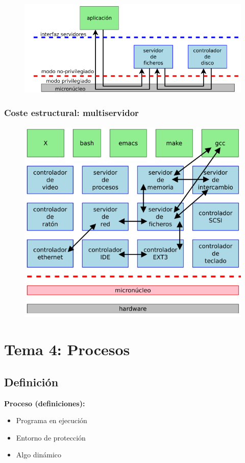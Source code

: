 \documentclass{article}
\begin{document}
\begin{figure}[h]
\centering
\includegraphics[scale=1,width=\textwidth]{llamada_kernel.png}
\end{figure}

\newpage

\subsubsection{Coste estructural: multiservidor}
\begin{figure}[h]
\centering
\includegraphics[scale=1, width=\textwidth]{multisevidor.png}
\end{figure}

\section{Tema 4: Procesos}
\subsection{Definición}
\textbf{Proceso (definiciones):}
\begin{itemize}
\item Programa en ejecución
\item Entorno de protección
\item Algo dinámico
\end{itemize}
\end{document}
